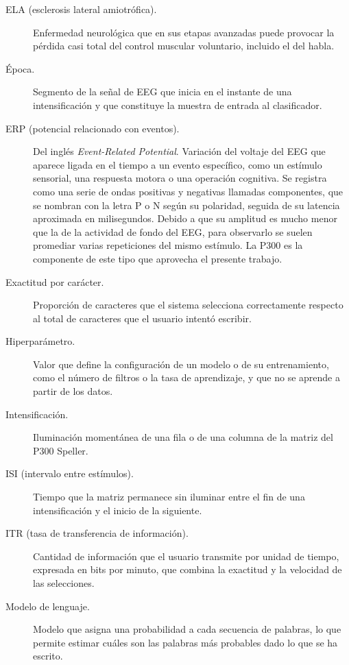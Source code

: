 \begin{description}
  \item[ELA (esclerosis lateral amiotrófica).] Enfermedad neurológica que en sus etapas avanzadas
  puede provocar la pérdida casi total del control muscular voluntario, incluido el del habla.

  \item[Época.] Segmento de la señal de EEG que inicia en el instante de una intensificación y que
  constituye la muestra de entrada al clasificador.

  \item[ERP (potencial relacionado con eventos).] Del inglés \textit{Event-Related Potential}.
  Variación del voltaje del EEG que aparece ligada en el tiempo a un evento específico, como un
  estímulo sensorial, una respuesta motora o una operación cognitiva. Se registra como una serie de
  ondas positivas y negativas llamadas componentes, que se nombran con la letra P o N según su
  polaridad, seguida de su latencia aproximada en milisegundos. Debido a que su amplitud es mucho
  menor que la de la actividad de fondo del EEG, para observarlo se suelen promediar varias
  repeticiones del mismo estímulo. La P300 es la componente de este tipo que aprovecha el presente
  trabajo.

  \item[Exactitud por carácter.] Proporción de caracteres que el sistema selecciona correctamente
  respecto al total de caracteres que el usuario intentó escribir.

  \item[Hiperparámetro.] Valor que define la configuración de un modelo o de su entrenamiento, como
  el número de filtros o la tasa de aprendizaje, y que no se aprende a partir de los datos.

  \item[Intensificación.] Iluminación momentánea de una fila o de una columna de la matriz del P300
  Speller.

  \item[ISI (intervalo entre estímulos).] Tiempo que la matriz permanece sin iluminar entre el fin
  de una intensificación y el inicio de la siguiente.

  \item[ITR (tasa de transferencia de información).] Cantidad de información que el usuario
  transmite por unidad de tiempo, expresada en bits por minuto, que combina la exactitud y la
  velocidad de las selecciones.

  \item[Modelo de lenguaje.] Modelo que asigna una probabilidad a cada secuencia de palabras, lo que
  permite estimar cuáles son las palabras más probables dado lo que se ha escrito.


\end{description}
